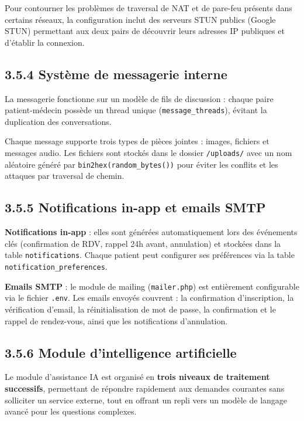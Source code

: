 \documentclass[12pt,a4paper]{report}
\begin{document}
Pour contourner les probl\`emes de traversal de NAT et de pare-feu pr\'esents dans certains r\'eseaux, la configuration inclut des serveurs STUN publics (Google STUN) permettant aux deux pairs de d\'ecouvrir leurs adresses IP publiques et d'\'etablir la connexion.

\subsection*{3.5.4 Syst\`eme de messagerie interne}

La messagerie fonctionne sur un mod\`ele de fils de discussion : chaque paire patient-m\'edecin poss\`ede un thread unique (\texttt{message\_threads}), \'evitant la duplication des conversations.

Chaque message supporte trois types de pi\`eces jointes : images, fichiers et messages audio. Les fichiers sont stock\'es dans le dossier \texttt{/uploads/} avec un nom al\'eatoire g\'en\'er\'e par \texttt{bin2hex(random\_bytes())} pour \'eviter les conflits et les attaques par traversal de chemin.

\subsection*{3.5.5 Notifications in-app et emails SMTP}

\noindent\textbf{Notifications in-app} : elles sont g\'en\'er\'ees automatiquement lors des \'ev\'enements cl\'es (confirmation de RDV, rappel 24h avant, annulation) et stock\'ees dans la table \texttt{notifications}. Chaque patient peut configurer ses pr\'ef\'erences via la table \texttt{notification\_preferences}.

\medskip
\noindent\textbf{Emails SMTP} : le module de mailing (\texttt{mailer.php}) est enti\`erement configurable via le fichier \texttt{.env}. Les emails envoy\'es couvrent : la confirmation d'inscription, la v\'erification d'email, la r\'einitialisation de mot de passe, la confirmation et le rappel de rendez-vous, ainsi que les notifications d'annulation.

\subsection*{3.5.6 Module d'intelligence artificielle}

Le module d'assistance IA est organis\'e en \textbf{trois niveaux de traitement successifs}, permettant de r\'epondre rapidement aux demandes courantes sans solliciter un service externe, tout en offrant un repli vers un mod\`ele de langage avanc\'e pour les questions complexes.
\end{document}
